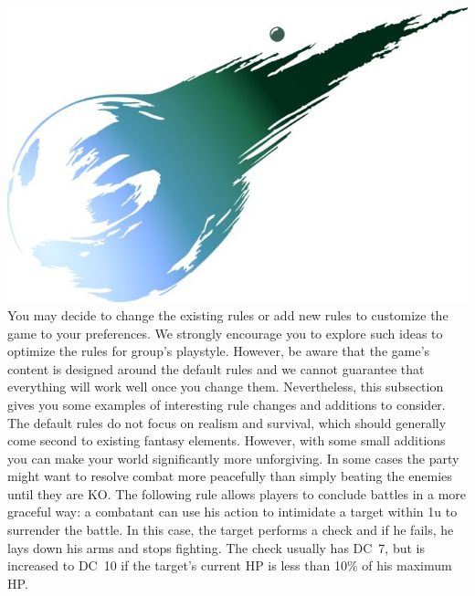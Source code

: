 %
%
\vfill
%
\includegraphics[width=\columnwidth]{./art/images/ff7.jpg}
%
\vfill
%
You may decide to change the existing rules or add new rules to customize the game to your preferences.
We strongly encourage you to explore such ideas to optimize the rules for group's playstyle.
However, be aware that the game's content is designed around the default rules and we cannot guarantee that everything will work well once you change them.
Nevertheless, this subsection gives you some examples of interesting rule changes and additions to consider.
%
\vfill
%
The default rules do not focus on realism and survival, which should generally come second to existing fantasy elements.
However, with some small additions you can make your world significantly more unforgiving.\ofrow
{}
%
\vfill
%
In some cases the party might want to resolve combat more peacefully than simply beating the enemies until they are KO.
The following rule allows players to conclude battles in a more graceful way:
a combatant can use his action to intimidate a target within 1u to surrender the battle.
In this case, the target performs a check and if he fails, he lays down his arms and stops fighting. 
The check usually has DC~7, but is increased to DC~10 if the target's current HP is less than 10\% of his maximum HP.
